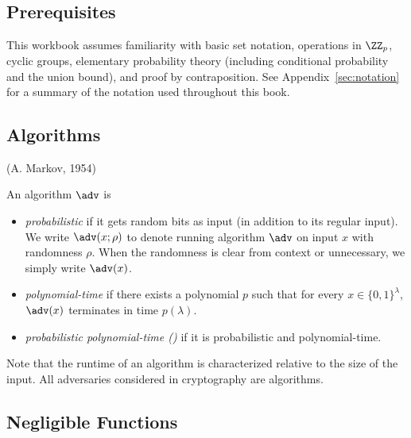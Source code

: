 \subsection{Prerequisites}

This workbook assumes familiarity with basic set notation, operations in $\ZZ_p$, cyclic groups, elementary probability theory (including conditional probability and the union bound), and proof by contraposition.
See Appendix~\ref{sec:notation} for a summary of the notation used throughout this book.

\subsection{Algorithms}

 (A. Markov, 1954)

\begin{definition}
An algorithm $\adv$ is
\begin{itemize}
\item \emph{probabilistic} if it gets random bits as input (in addition to its regular input).
We write $\adv(x; \rho)$ to denote running algorithm $\adv$ on input $x$ with randomness $\rho$.
When the randomness is clear from context or unnecessary, we simply write $\adv(x)$.
\item \emph{polynomial-time} if there exists a polynomial $p$ such that for every $x \in \{0,1\}^\lambda$, $\adv(x)$ terminates in time $p(\lambda)$.
\item \emph{probabilistic polynomial-time (\ppt)} if it is probabilistic and polynomial-time.
\end{itemize}
\end{definition}

Note that the runtime of an algorithm is characterized relative to the size of the input.
All adversaries considered in cryptography are algorithms.

\subsection{Negligible Functions}



